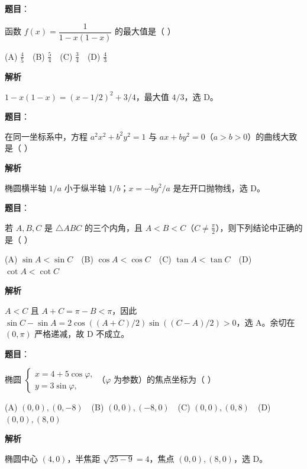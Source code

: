 \begin{answer}

\textbf{题目}：

函数 $f(x)=\dfrac1{1-x(1-x)}$ 的最大值是（ ）

   (A) $\frac45$　(B) $\frac54$　(C) $\frac34$　(D) $\frac43$

\textbf{解析}

$1-x(1-x)=(x-1/2)^2+3/4$，最大值 $4/3$，选 D。


\end{answer}
\begin{answer}

\textbf{题目}：

在同一坐标系中，方程 $a^2x^2+b^2y^2=1$ 与 $ax+by^2=0$（$a>b>0$）的曲线大致是（ ）
\nopagebreak[4]
\begin{center}\end{center}
\nopagebreak[4]
\textbf{解析}

椭圆横半轴 $1/a$ 小于纵半轴 $1/b$；$x=-by^2/a$ 是左开口抛物线，选 D。


\end{answer}
\begin{answer}

\textbf{题目}：

若 $A,B,C$ 是 $\triangle ABC$ 的三个内角，且 $A<B<C$（$C\ne\frac\pi2$），则下列结论中正确的是（ ）

   (A) $\sin A<\sin C$　(B) $\cos A<\cos C$　(C) $\tan A<\tan C$　(D) $\cot A<\cot C$

\textbf{解析}

$A<C$ 且 $A+C=\pi-B<\pi$，因此 $\sin C-\sin A=2\cos((A+C)/2)\sin((C-A)/2)>0$，选 A。余切在 $(0,\pi)$ 严格递减，故 D 不成立。


\end{answer}
\begin{answer}

\textbf{题目}：

椭圆 $\begin{cases}x=4+5\cos\varphi,\\y=3\sin\varphi,\end{cases}$（$\varphi$ 为参数）的焦点坐标为（ ）

   (A) $(0,0),(0,-8)$　(B) $(0,0),(-8,0)$　(C) $(0,0),(0,8)$　(D) $(0,0),(8,0)$

\textbf{解析}

椭圆中心 $(4,0)$，半焦距 $\sqrt{25-9}=4$，焦点 $(0,0),(8,0)$，选 D。


\end{answer}
